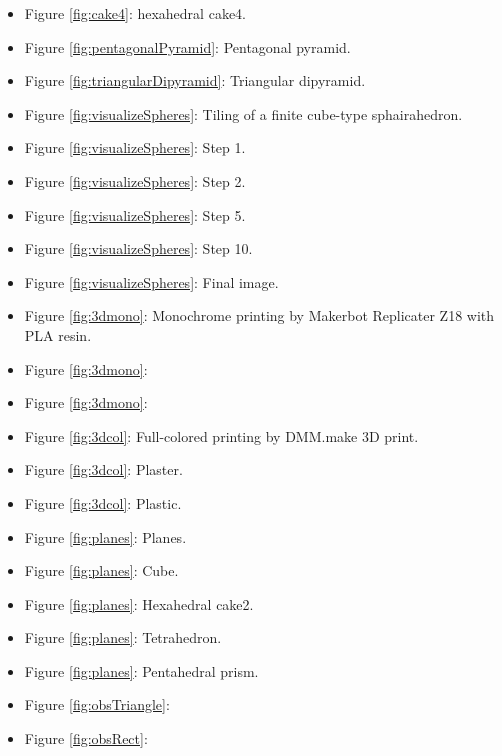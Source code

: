 \documentclass[suppldata, dvipdfmx]{interact}
\theoremstyle{plain}%
\theoremstyle{definition}
\theoremstyle{remark}
\theoremstyle{problemstyle}
\begin{document}
\begin{itemize}
\item Figure \ref{fig:cake4}: hexahedral cake4.
\item Figure \ref{fig:pentagonalPyramid}: Pentagonal pyramid.
\item Figure \ref{fig:triangularDipyramid}: Triangular dipyramid.

\item Figure \ref{fig:visualizeSpheres}: Tiling of a finite cube-type
      sphairahedron.
\item Figure
      \ref{fig:visualizeSpheres}: Step
      1.
\item Figure
      \ref{fig:visualizeSpheres}: Step
      2.
\item Figure
      \ref{fig:visualizeSpheres}: Step
      5.
\item Figure
      \ref{fig:visualizeSpheres}: Step
      10.
\item Figure
      \ref{fig:visualizeSpheres}:
      Final image.
\item Figure \ref{fig:3dmono}: Monochrome printing by Makerbot
      Replicater Z18 with PLA resin.
\item Figure \ref{fig:3dmono}:
\item Figure \ref{fig:3dmono}:

\item Figure \ref{fig:3dcol}: Full-colored printing by DMM.make 3D
      print.
\item Figure \ref{fig:3dcol}: Plaster.
\item Figure \ref{fig:3dcol}: Plastic.

\item Figure \ref{fig:planes}: Planes.
\item Figure \ref{fig:planes}: Cube.
\item Figure \ref{fig:planes}: Hexahedral cake2.
\item Figure \ref{fig:planes}: Tetrahedron.
\item Figure \ref{fig:planes}: Pentahedral
      prism.

\item Figure \ref{fig:obsTriangle}:
\item Figure \ref{fig:obsRect}:


\end{itemize}
\end{document}
